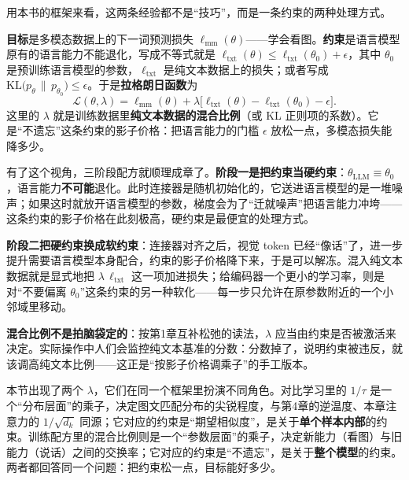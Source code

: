 用本书的框架来看，这两条经验都不是“技巧”，而是一条约束的两种处理方式。

\begin{keyidea}
\textbf{目标}是多模态数据上的下一词预测损失 $\ell_{\text{mm}}(\theta)$——学会看图。\textbf{约束}是语言模型原有的语言能力不能退化，写成不等式就是 $\ell_{\text{txt}}(\theta) \le \ell_{\text{txt}}(\theta_0) + \epsilon$，其中 $\theta_0$ 是预训练语言模型的参数，$\ell_{\text{txt}}$ 是纯文本数据上的损失；或者写成 $\mathrm{KL}\big(p_\theta \,\|\, p_{\theta_0}\big) \le \epsilon$。于是\textbf{拉格朗日函数}为
\begin{equation}
    \mathcal{L}(\theta, \lambda) = \ell_{\text{mm}}(\theta) + \lambda \big[\ell_{\text{txt}}(\theta) - \ell_{\text{txt}}(\theta_0) - \epsilon\big].
\end{equation}
这里的 \textbf{$\lambda$} 就是训练数据里\textbf{纯文本数据的混合比例}（或 KL 正则项的系数）。它是“不遗忘”这条约束的影子价格：把语言能力的门槛 $\epsilon$ 放松一点，多模态损失能降多少。
\end{keyidea}

有了这个视角，三阶段配方就顺理成章了。\textbf{阶段一是把约束当硬约束}：$\theta_{\text{LLM}} \equiv \theta_0$，语言能力\textbf{不可能}退化。此时连接器是随机初始化的，它送进语言模型的是一堆噪声；如果这时就放开语言模型的参数，梯度会为了“迁就噪声”把语言能力冲垮——这条约束的影子价格在此刻极高，硬约束是最便宜的处理方式。

\textbf{阶段二把硬约束换成软约束}：连接器对齐之后，视觉 token 已经“像话”了，进一步提升需要语言模型本身配合，约束的影子价格降下来，于是可以解冻。混入纯文本数据就是显式地把 $\lambda\,\ell_{\text{txt}}$ 这一项加进损失；给编码器一个更小的学习率，则是对“不要偏离 $\theta_0$”这条约束的另一种软化——每一步只允许在原参数附近的一个小邻域里移动。

\textbf{混合比例不是拍脑袋定的}：按第1章互补松弛的读法，$\lambda$ 应当由约束是否被激活来决定。实际操作中人们会监控纯文本基准的分数：分数掉了，说明约束被违反，就该调高纯文本比例——这正是“按影子价格调乘子”的手工版本。

\begin{physicalmeaning}[title=$\lambda$ 在视觉--语言模型里的两种身份]
本节出现了两个 $\lambda$，它们在同一个框架里扮演不同角色。对比学习里的 $1/\tau$ 是一个“分布层面”的乘子，决定图文匹配分布的尖锐程度，与第4章的逆温度、本章注意力的 $1/\sqrt{d_k}$ 同源；它对应的约束是“期望相似度”，是关于\textbf{单个样本内部}的约束。训练配方里的混合比例则是一个“参数层面”的乘子，决定新能力（看图）与旧能力（说话）之间的交换率；它对应的约束是“不遗忘”，是关于\textbf{整个模型}的约束。两者都回答同一个问题：把约束松一点，目标能好多少。
\end{physicalmeaning}

